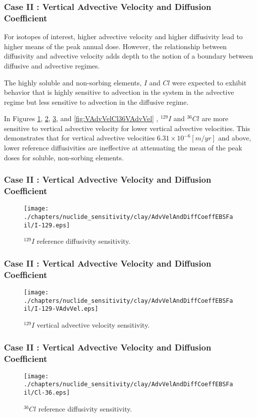 \begin{frame}[c]
  \frametitle{Case II : Vertical Advective Velocity and Diffusion Coefficient}
For isotopes of interest, higher advective velocity and higher diffusivity lead to higher 
means of the peak annual dose. However, the relationship between diffusivity and 
advective velocity adds depth to the notion of a boundary between diffusive and 
advective regimes.

The highly soluble and non-sorbing elements, $I$ and $Cl$ 
were expected to exhibit behavior that is highly sensitive 
to advection in the system in the advective regime but less sensitive to 
advection in the diffusive regime.  

In Figures \ref{fig:VAdvVelI129}, \ref{fig:VAdvVelI129VAdvVel}, 
\ref{fig:VAdvVelCl36}, and \ref{fig:VAdvVelCl36VAdvVel} , $^{129}I$ and 
$^{36}Cl$ are more sensitive to vertical advective velocity for lower vertical 
advective velocities. This demonstrates that for vertical advective velocities 
$6.31\times10^{-6}[m/yr]$ and above, lower reference diffusivities are 
ineffective at attenuating the mean of the peak doses for soluble, non-sorbing 
elements. 
\end{frame}

\begin{frame}[c]
  \frametitle{Case II : Vertical Advective Velocity and Diffusion Coefficient}

\begin{figure}[htp!]
\centering
\texttt{[image: ./chapters/nuclide\_sensitivity/clay/AdvVelAndDiffCoeffEBSFail/I-129.eps]}
\caption{$^{129}I$ reference diffusivity sensitivity.}
\label{fig:VAdvVelI129}
\end{figure}
\end{frame}

\begin{frame}[c]
  \frametitle{Case II : Vertical Advective Velocity and Diffusion Coefficient}

\begin{figure}[ht!]
\centering
\texttt{[image: ./chapters/nuclide\_sensitivity/clay/AdvVelAndDiffCoeffEBSFail/I-129-VAdvVel.eps]}
\caption{$^{129}I$ vertical advective velocity sensitivity.}
\label{fig:VAdvVelI129VAdvVel}
\end{figure}
\end{frame}


\begin{frame}[c]
  \frametitle{Case II : Vertical Advective Velocity and Diffusion Coefficient}

\begin{figure}[htp!]
\centering
\texttt{[image: ./chapters/nuclide\_sensitivity/clay/AdvVelAndDiffCoeffEBSFail/Cl-36.eps]}
\caption{$^{36}Cl$ reference diffusivity sensitivity.}
\label{fig:VAdvVelCl36}
\end{figure}
\end{frame}


